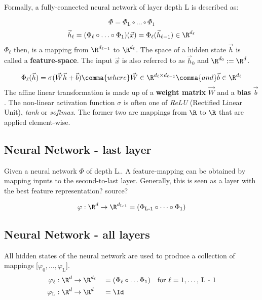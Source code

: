 Formally, a fully-connected neural network of layer depth L is described as:

\[
    \Phi = \Phi_\text{L} \circ \ldots \circ \Phi_1
\]
\[
    \vec h_\ell = (\Phi_\ell \circ \ldots \circ \Phi_1) (\vec x) =
    \Phi_\ell(\vec h_{\ell-1}) \in \R^{d_\ell}
\]
$\Phi_\ell$ then, is a mapping from $\R^{d_{\ell-1}}$ to $\R^{d_\ell}$. 
The space of a hidden state $\vec h$ is called a \textbf{feature-space}.
The input $\vec x$ is also referred to as $\vec h_0$ and $\R^{d_0} := \R^d$.

\[
    \Phi_\ell(\vec h) = \sigma (\vec W \vec h + \vec b) \comma{where}
    \vec W \in \R^{d_\ell \times d_{\ell-1}} \comma{and}
    \vec b \in \R^{d_\ell}
\]
The affine linear transformation is made up of a \textbf{weight matrix} $\vec W$ and a \textbf{bias} $\vec b$.
The non-linear activation function $\sigma$ is often one of \textit{ReLU} (Rectified Linear Unit), \textit{tanh} or \textit{softmax}. The former two are mappings from $\R$ to $\R$ that are applied element-wise.




\subsection{Neural Network - last layer}

Given a neural network $\Phi$ of depth L..
A feature-mapping can be obtained by mapping inputs to the second-to-last layer.
Generally, this is seen as a layer with the best feature representation? source?


\[
    \varphi : \R^d \to \R^{d_\textnormal{L-1}} = (\Phi_\textnormal{L-1} \circ \dots \circ \Phi_1)
\]
\subsection{Neural Network - all layers}
All hidden states of the neural network are used to produce a collection of mappings [$\varphi_0, \dots, \varphi_\text{L}$].
\begin{alignat*}{2}
    \varphi_\ell &: \R^d \to \R^{d_\ell} &&= (\Phi_\ell \circ \dots \Phi_1) \quad
    \text{for $\ell = 1, \dots$, L - 1} \\
    \varphi_\textnormal{L} &: \R^d \to \R^d &&= \Id
\end{alignat*}





